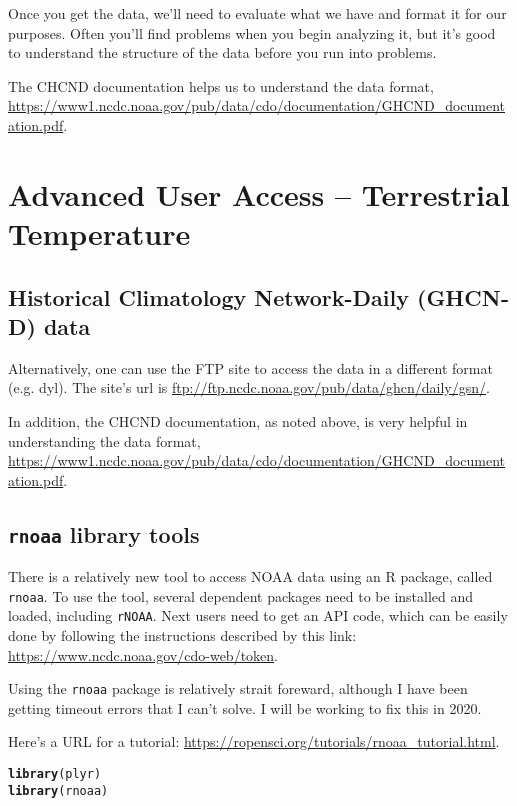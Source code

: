 \documentclass{article}\usepackage[]{graphicx}\usepackage[]{color}
\makeatletter
\newcommand{\hlstd}[1]{\textcolor[rgb]{0.345,0.345,0.345}{#1}}%
\newcommand{\hlkwd}[1]{\textcolor[rgb]{0.737,0.353,0.396}{\textbf{#1}}}%
\newenvironment{kframe}{%
 \def\at@end@of@kframe{}%
 \ifinner\ifhmode%
  \def\at@end@of@kframe{\end{minipage}}%
  \begin{minipage}{\columnwidth}%
 \fi\fi%
 \def\FrameCommand##1{\hskip\@totalleftmargin \hskip-\fboxsep
 \colorbox{shadecolor}{##1}\hskip-\fboxsep
     \hskip-\linewidth \hskip-\@totalleftmargin \hskip\columnwidth}%
 \MakeFramed {\advance\hsize-\width
   \@totalleftmargin\z@ \linewidth\hsize
   \@setminipage}}%
 {\par\unskip\endMakeFramed%
 \at@end@of@kframe}
\newenvironment{knitrout}{}{} %
\makeatother
\begin{document}
Once you get the data, we'll need to evaluate what we have and format it for our purposes. Often you'll find problems when you begin analyzing it, but it's good to understand the structure of the data before you run into problems. 

The CHCND documentation helps us to understand the data format, \url{https://www1.ncdc.noaa.gov/pub/data/cdo/documentation/GHCND_documentation.pdf}.



\section{Advanced User Access -- Terrestrial Temperature}  

\subsection{Historical Climatology Network-Daily (GHCN‐D) data}

Alternatively, one can use the FTP site to access the data in a different format (e.g. dyl). The site's url is \url{ftp://ftp.ncdc.noaa.gov/pub/data/ghcn/daily/gsn/}. 

In addition, the CHCND documentation, as noted above, is very helpful in understanding the data format, \url{https://www1.ncdc.noaa.gov/pub/data/cdo/documentation/GHCND_documentation.pdf}.

\subsection{\texttt{rnoaa} library tools}

There is a relatively new tool to access NOAA data using an R package, called \texttt{rnoaa}. To use the tool, several dependent packages need to be installed and loaded, including \texttt{rNOAA}. Next users need to get an API code, which can be easily done by following the instructions described by this link: \url{https://www.ncdc.noaa.gov/cdo-web/token}.

Using the \texttt{rnoaa} package is relatively strait foreward, although I have been getting timeout errors that I can't solve. I will be working to fix this in 2020. 

Here's a URL for a tutorial: \url{https://ropensci.org/tutorials/rnoaa_tutorial.html}.

\begin{knitrout}
\color{fgcolor}\begin{kframe}
\begin{alltt}
\hlkwd{library}\hlstd{(plyr)}
\hlkwd{library}\hlstd{(rnoaa)}
\end{alltt}
\end{kframe}
\end{knitrout}
\end{document}
